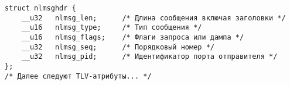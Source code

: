 \begin{verbatim}
struct nlmsghdr {
    __u32   nlmsg_len;      /* Длина сообщения включая заголовки */
    __u16   nlmsg_type;     /* Тип сообщения */
    __u16   nlmsg_flags;    /* Флаги запроса или дампа */
    __u32   nlmsg_seq;      /* Порядковый номер */
    __u32   nlmsg_pid;      /* Идентификатор порта отправителя */
};
/* Далее следуют TLV-атрибуты... */
\end{verbatim}
